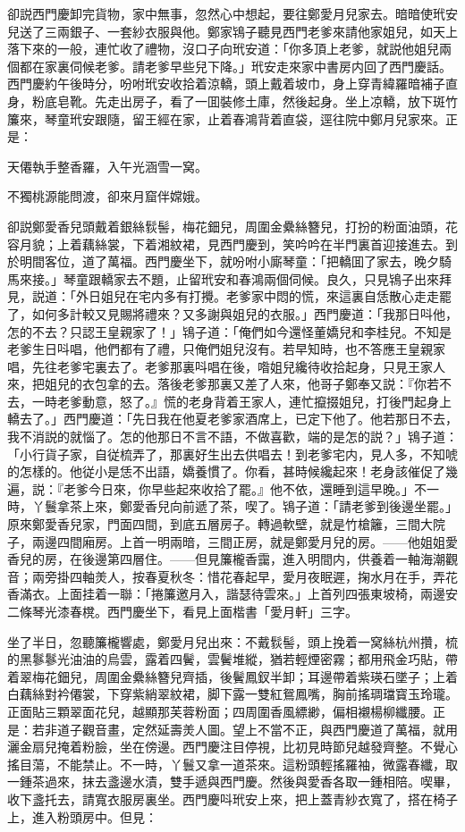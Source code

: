 卻説西門慶卸完貨物，家中無事，忽然心中想起，要往鄭愛月兒家去。暗暗使玳安兒送了三兩銀子、一套紗衣服與他。鄭家鴇子聽見西門老爹來請他家姐兒，如天上落下來的一般，連忙收了禮物，沒口子向玳安道：「你多頂上老爹，就説他姐兒兩個都在家裏伺候老爹。請老爹早些兒下降。」玳安走來家中書房内回了西門慶話。西門慶約午後時分，吩咐玳安收拾着涼轎，頭上戴着坡巾，身上穿青緯羅暗補子直身，粉底皂靴。先走出房子，看了一囬裝修土庫，然後起身。坐上凉轎，放下斑竹簾來，琴童玳安跟隨，留王經在家，止着春鴻背着直袋，逕往院中鄭月兒家來。正是：

\begin{myquote}
天僊執手整香羅，入午光涵雪一窝。

不獨桃源能問渡，卻來月窟伴嫦娥。
\end{myquote}

卻説鄭愛香兒頭戴着銀絲䯼髻，梅花鈿兒，周圍金纍絲簪兒，打扮的粉面油頭，花容月貌；上着藕絲裳，下着湘紋裙，見西門慶到，笑吟吟在半門裏首迎接進去。到於明間客位，道了萬福。西門慶坐下，就吩咐小廝琴童：「把轎囬了家去，晚夕騎馬來接。」琴童跟轎家去不題，止留玳安和春鴻兩個伺候。良久，只見鴇子出來拜見，説道：「外日姐兒在宅内多有打攪。老爹家中悶的慌，來這裏自恁散心走走罷了，如何多計較又見賜將禮來？又多謝與姐兒的衣服。」西門慶道：「我那日呌他，怎的不去？只認王皇親家了！」鴇子道：「俺們如今還怪董嬌兒和李桂兒。不知是老爹生日呌唱，他們都有了禮，只俺們姐兒沒有。若早知時，也不答應王皇親家唱，先往老爹宅裏去了。老爹那裏呌唱在後，喒姐兒纔待收拾起身，只見王家人來，把姐兒的衣包拿的去。落後老爹那裏又差了人來，他哥子鄭奉又説：『你若不去，一時老爹動意，怒了。』慌的老身背着王家人，連忙攛掇姐兒，打後門起身上轎去了。」西門慶道：「先日我在他夏老爹家酒席上，已定下他了。他若那日不去，我不消説的就惱了。怎的他那日不言不語，不做喜歡，端的是怎的説？」鴇子道：「小行貨子家，自従梳弄了，那裏好生出去供唱去！到老爹宅内，見人多，不知唬的怎樣的。他従小是恁不出語，嬌養慣了。你看，甚時候纔起來！老身該催促了幾遍，説：『老爹今日來，你早些起來收拾了罷。』他不依，還睡到這早晚。」不一時，丫鬟拿茶上來，鄭愛香兒向前遞了茶，喫了。鴇子道：「請老爹到後邊坐罷。」原來鄭愛香兒家，門面四間，到底五層房子。轉過軟壁，就是竹槍籬，三間大院子，兩邊四間廂房。上首一明兩暗，三間正房，就是鄭愛月兒的房。——他姐姐愛香兒的房，在後邊第四層住。——但見簾櫳香靄，進入明間内，供養着一軸海潮觀音；兩旁掛四軸羙人，按春夏秋冬：惜花春起早，愛月夜眠遲，掬水月在手，弄花香滿衣。上面挂着一聯：「捲簾邀月入，諧瑟待雲來。」上首列四張東坡椅，兩邊安二條琴光漆春櫈。西門慶坐下，看見上面楷書「愛月軒」三字。

坐了半日，忽聽簾櫳響處，鄭愛月兒出來：不戴䯼髻，頭上挽着一窝絲杭州攢，梳的黑鬖鬖光油油的烏雲，露着四鬢，雲鬢堆縱，猶若輕煙密霧；都用飛金巧貼，帶着翠梅花鈿兒，周圍金纍絲簪兒齊插，後鬢鳳釵半卸；耳邊帶着紫瑛石墜子；上着白藕絲對衿僊裳，下穿紫綃翠紋裙，脚下露一雙紅鴛鳳嘴，胸前搖琱璫寳玉玲瓏。正面貼三顆翠面花兒，越顯那芙蓉粉面；四周圍香風縹緲，偏相襯楊柳纖腰。正是：若非道子觀音畫，定然延壽羙人圖。望上不當不正，與西門慶道了萬福，就用灑金扇兒掩着粉臉，坐在傍邊。西門慶注目停視，比初見時節兒越發齊整。不覺心搖目蕩，不能禁止。不一時，丫鬟又拿一道茶來。這粉頭輕搖羅袖，微露春纖，取一鍾茶過來，抹去盞邊水漬，雙手遞與西門慶。然後與愛香各取一鍾相陪。喫畢，收下盞托去，請寬衣服房裏坐。西門慶呌玳安上來，把上蓋青紗衣寬了，搭在椅子上，進入粉頭房中。但見：

